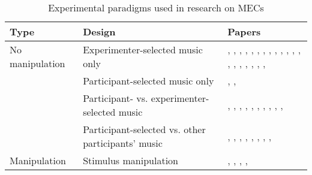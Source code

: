 \begin{table}[t!]
\centering
\scriptsize
\def\arraystretch{1.2}

\begin{threeparttable}
\caption{Experimental paradigms used in research on MECs}
\label{tab:rev-2}

\begin{tabular*}{\textwidth}{
    >{\raggedright}p{}
    >{\raggedright}p{}
    >{\raggedright\arraybackslash}p{}}

\hline

\textbf{Type} & \textbf{Design} & \textbf{Papers} \\ 

\hline
No manipulation & Experimenter-selected music only & 
    \textcite{baltes2011}, \textcite{baltes2014}, \textcite{bannister2019}, \textcite{colver2016}, \textcite{grewe2011}, \textcite{grunkina2017}, \textcite{guhn2007}, \textcite{jaimovich2013}, \textcite{ji2019}, \textcite{klepzig2020}, \textcite{konecni2007b}, \textcite{polo2017}, \textcite{schafer2011}, \textcite{schubert2018}, \textcite{seibt2017}, \textcite{seibt2018}, \textcite{silvia2015}, \textcite{solberg2019}, \textcite{strick2015}, \textcite{wassiliwizky2015}, \textcite{zickfeld2019a} \\ 

\cline{2-3}   
& Participant-selected music only & 
    \textcite{craig2009}, \textcite{fukui2013}, \textcite{wassiliwizky2017a} \\

\cline{2-3}
& Participant- vs. experimenter-selected music & 
    \textcite{benedek2011}, \textcite{carr2016}, \textcite{craig2005}, \textcite{grewe2007}, \textcite{masherrero2014}, \textcite{nagel2008}, \textcite{panksepp1995}, \textcite{quesnel2018}, \textcite{rickard2004}, \textcite{weth2015}, \textcite{wassiliwizky2017b} \\

\cline{2-3}    
& Participant-selected vs. other participants' music & 
    \textcite{blood2001}, \textcite{laeng2016}, \textcite{mori2014b}, \textcite{mori2015}, \textcite{mori2017}, \textcite{sachs2016}, \textcite{salimpoor2009}, \textcite{salimpoor2011}, \textcite{sumpf2015} \\
    
\hline
Manipulation & Stimulus manipulation & 
    \textcite{bannister2018}, \textcite{bannister2020b}, \textcite{honda2020}, \textcite{juslin2014}, \textcite{park2019} \\


\end{tabular*}
\end{threeparttable}
\end{table}
